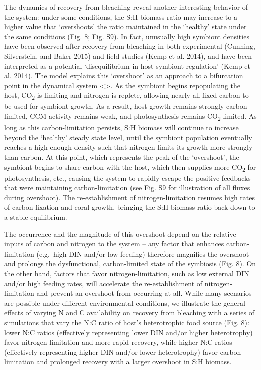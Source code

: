 \documentclass[]{elsarticle} %
\begin{document}
The dynamics of recovery from bleaching reveal another interesting
behavior of the system: under some conditions, the S:H biomass ratio may
increase to a higher value that `overshoots' the ratio maintained in the
`healthy' state under the same conditions (Fig. 8; Fig. S9). In fact,
unusually high symbiont densities have been observed after recovery from
bleaching in both experimental (Cunning, Silverstein, and Baker 2015)
and field studies (Kemp et al. 2014), and have been interpreted as a
potential `disequilibrium in host-symbiont regulation' (Kemp et al.
2014). The model explains this `overshoot' as an approach to a
bifurcation point in the dynamical system \textless{}\textgreater{}. As
the symbiont begins repopulating the host, CO\textsubscript{2} is
limiting and nitrogen is replete, allowing nearly all fixed carbon to be
used for symbiont growth. As a result, host growth remains strongly
carbon-limited, CCM activity remains weak, and photosynthesis remains
CO\textsubscript{2}-limited. As long as this carbon-limitation persists,
S:H biomass will continue to increase beyond the `healthy' steady state
level, until the symbiont population eventually reaches a high enough
density such that nitrogen limits its growth more strongly than carbon.
At this point, which represents the peak of the `overshoot', the
symbiont begins to share carbon with the host, which then supplies more
CO\textsubscript{2} for photosynthesis, etc., causing the system to
rapidly escape the positive feedbacks that were maintaining
carbon-limitation (see Fig. S9 for illustration of all fluxes during
overshoot). The re-establishment of nitrogen-limitation resumes high
rates of carbon fixation and coral growth, bringing the S:H biomass
ratio back down to a stable equilibrium.

The occurrence and the magnitude of this overshoot depend on the
relative inputs of carbon and nitrogen to the system -- any factor that
enhances carbon-limitation (e.g.~high DIN and/or low feeding) therefore
magnifies the overshoot and prolongs the dysfunctional, carbon-limited
state of the symbiosis (Fig. 8). On the other hand, factors that favor
nitrogen-limitation, such as low external DIN and/or high feeding rates,
will accelerate the re-establishment of nitrogen-limitation and prevent
an overshoot from occurring at all. While many scenarios are possible
under different environmental conditions, we illustrate the general
effects of varying N and C availability on recovery from bleaching with
a series of simulations that vary the N:C ratio of host's heterotrophic
food source (Fig. 8): lower N:C ratios (effectively representing lower
DIN and/or higher heterotrophy) favor nitrogen-limitation and more rapid
recovery, while higher N:C ratios (effectively representing higher DIN
and/or lower heterotrophy) favor carbon-limitation and prolonged
recovery with a larger overshoot in S:H biomass.
\end{document}
